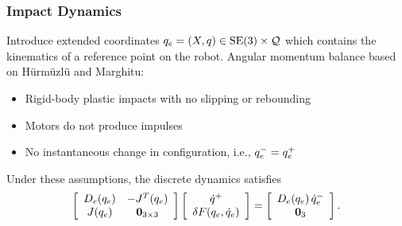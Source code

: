 \begin{frame}[t]
  \frametitle{Impact Dynamics}
  Introduce extended coordinates $q_{e} = (X, q) \in \mathrm{SE}(3) \times \mathcal{Q}$ which contains the kinematics of a reference point on the robot. Angular momentum balance based on H{\"u}rm{\"u}zl{\"u} and Marghitu:
  \begin{massump}
    \vspace{-.3em}
    \begin{itemize}
    \item Rigid-body plastic impacts with no slipping or rebounding
    \item Motors do not produce impulses
    \item No instantaneous change in configuration, i.e., $q_{e}^{-} = q_{e}^{+}$
    \end{itemize}
  \end{massump}\vspace{-.5em}
  Under these assumptions, the discrete dynamics satisfies
  \begin{align*}
    \left[\begin{array}{c c}
        D_{e}(q_{e}) & -J^{T}(q_{e})\\
        J(q_{e}) & \mathbf{0}_{3 \times 3}
      \end{array}\right]
    \left[\begin{array}{c}
        \dot q^{+}\\
        \delta F(q_{e}, \dot q_{e})
      \end{array}\right]
    = \left[\begin{array}{c c}
        D_{e}(q_{e}) \, \dot q_{e}^{-}\\
        \mathbf{0}_{3}
      \end{array}\right].
  \end{align*}
\end{frame}

